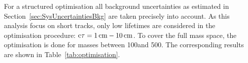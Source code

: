 For a structured optimisation all background uncertainties as estimated in Section~\ref{sec:SysUncertaintiesBkg} are taken precisely into account. 
As this analysis focus on short tracks, only low lifetimes are considered in the optimisation procedure: $\text{c}\tau=1\,\text{cm}-10\,\text{cm}$.
To cover the full mass space, the optimisation is done for masses between 100\gev and 500\gev.
The corresponding results are shown in Table~\ref{tab:optimisation}.
\renewcommand{\arraystretch}{1.3}
\begin{table}[!h]
\centering
\caption{Optimal \pt and \ias selection cuts and the corresponding minimum cross section $\sigma_{\text{min}}$ that can be discovered with 5$\sigma$ significance for different signal models.
         For some signal samples a optimisation result is not available due to the limited size of these samples.}
\label{tab:optimisation}
\end{table}
